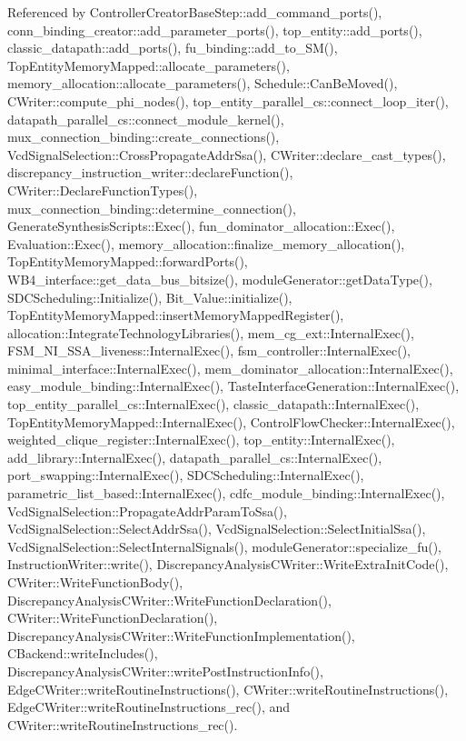 Referenced by Controller\+Creator\+Base\+Step\+::add\+\_\+command\+\_\+ports(), conn\+\_\+binding\+\_\+creator\+::add\+\_\+parameter\+\_\+ports(), top\+\_\+entity\+::add\+\_\+ports(), classic\+\_\+datapath\+::add\+\_\+ports(), fu\+\_\+binding\+::add\+\_\+to\+\_\+\+S\+M(), Top\+Entity\+Memory\+Mapped\+::allocate\+\_\+parameters(), memory\+\_\+allocation\+::allocate\+\_\+parameters(), Schedule\+::\+Can\+Be\+Moved(), C\+Writer\+::compute\+\_\+phi\+\_\+nodes(), top\+\_\+entity\+\_\+parallel\+\_\+cs\+::connect\+\_\+loop\+\_\+iter(), datapath\+\_\+parallel\+\_\+cs\+::connect\+\_\+module\+\_\+kernel(), mux\+\_\+connection\+\_\+binding\+::create\+\_\+connections(), Vcd\+Signal\+Selection\+::\+Cross\+Propagate\+Addr\+Ssa(), C\+Writer\+::declare\+\_\+cast\+\_\+types(), discrepancy\+\_\+instruction\+\_\+writer\+::declare\+Function(), C\+Writer\+::\+Declare\+Function\+Types(), mux\+\_\+connection\+\_\+binding\+::determine\+\_\+connection(), Generate\+Synthesis\+Scripts\+::\+Exec(), fun\+\_\+dominator\+\_\+allocation\+::\+Exec(), Evaluation\+::\+Exec(), memory\+\_\+allocation\+::finalize\+\_\+memory\+\_\+allocation(), Top\+Entity\+Memory\+Mapped\+::forward\+Ports(), W\+B4\+\_\+interface\+::get\+\_\+data\+\_\+bus\+\_\+bitsize(), module\+Generator\+::get\+Data\+Type(), S\+D\+C\+Scheduling\+::\+Initialize(), Bit\+\_\+\+Value\+::initialize(), Top\+Entity\+Memory\+Mapped\+::insert\+Memory\+Mapped\+Register(), allocation\+::\+Integrate\+Technology\+Libraries(), mem\+\_\+cg\+\_\+ext\+::\+Internal\+Exec(), F\+S\+M\+\_\+\+N\+I\+\_\+\+S\+S\+A\+\_\+liveness\+::\+Internal\+Exec(), fsm\+\_\+controller\+::\+Internal\+Exec(), minimal\+\_\+interface\+::\+Internal\+Exec(), mem\+\_\+dominator\+\_\+allocation\+::\+Internal\+Exec(), easy\+\_\+module\+\_\+binding\+::\+Internal\+Exec(), Taste\+Interface\+Generation\+::\+Internal\+Exec(), top\+\_\+entity\+\_\+parallel\+\_\+cs\+::\+Internal\+Exec(), classic\+\_\+datapath\+::\+Internal\+Exec(), Top\+Entity\+Memory\+Mapped\+::\+Internal\+Exec(), Control\+Flow\+Checker\+::\+Internal\+Exec(), weighted\+\_\+clique\+\_\+register\+::\+Internal\+Exec(), top\+\_\+entity\+::\+Internal\+Exec(), add\+\_\+library\+::\+Internal\+Exec(), datapath\+\_\+parallel\+\_\+cs\+::\+Internal\+Exec(), port\+\_\+swapping\+::\+Internal\+Exec(), S\+D\+C\+Scheduling\+::\+Internal\+Exec(), parametric\+\_\+list\+\_\+based\+::\+Internal\+Exec(), cdfc\+\_\+module\+\_\+binding\+::\+Internal\+Exec(), Vcd\+Signal\+Selection\+::\+Propagate\+Addr\+Param\+To\+Ssa(), Vcd\+Signal\+Selection\+::\+Select\+Addr\+Ssa(), Vcd\+Signal\+Selection\+::\+Select\+Initial\+Ssa(), Vcd\+Signal\+Selection\+::\+Select\+Internal\+Signals(), module\+Generator\+::specialize\+\_\+fu(), Instruction\+Writer\+::write(), Discrepancy\+Analysis\+C\+Writer\+::\+Write\+Extra\+Init\+Code(), C\+Writer\+::\+Write\+Function\+Body(), Discrepancy\+Analysis\+C\+Writer\+::\+Write\+Function\+Declaration(), C\+Writer\+::\+Write\+Function\+Declaration(), Discrepancy\+Analysis\+C\+Writer\+::\+Write\+Function\+Implementation(), C\+Backend\+::write\+Includes(), Discrepancy\+Analysis\+C\+Writer\+::write\+Post\+Instruction\+Info(), Edge\+C\+Writer\+::write\+Routine\+Instructions(), C\+Writer\+::write\+Routine\+Instructions(), Edge\+C\+Writer\+::write\+Routine\+Instructions\+\_\+rec(), and C\+Writer\+::write\+Routine\+Instructions\+\_\+rec().

